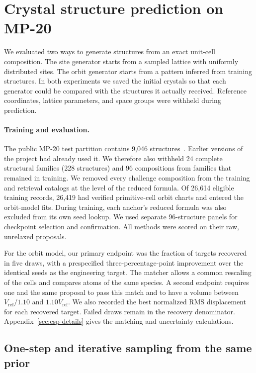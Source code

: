 \section{Crystal structure prediction on MP-20}\label{sec:csp-exp}

We evaluated two ways to generate structures from an exact unit-cell composition. The site generator starts from a sampled lattice with uniformly distributed sites. The orbit generator starts from a pattern inferred from training structures. In both experiments we saved the initial crystals so that each generator could be compared with the structures it actually received. Reference coordinates, lattice parameters, and space groups were withheld during prediction.

\paragraph{Training and evaluation.}
The public MP-20 test partition contains 9,046 structures~\cite{materialsproject,cdvae}. Earlier versions of the project had already used it. We therefore also withheld 24 complete structural families (228 structures) and 96 compositions from families that remained in training. We removed every challenge composition from the training and retrieval catalogs at the level of the reduced formula. Of 26,614 eligible training records, 26,419 had verified primitive-cell orbit charts and entered the orbit-model fits. During training, each anchor's reduced formula was also excluded from its own seed lookup. We used separate 96-structure panels for checkpoint selection and confirmation. All methods were scored on their raw, unrelaxed proposals.

For the orbit model, our primary endpoint was the fraction of targets recovered in five draws, with a prespecified three-percentage-point improvement over the identical seeds as the engineering target. The matcher allows a common rescaling of the cells and compares atoms of the same species. A second endpoint requires one and the same proposal to pass this match and to have a volume between $V_\mathrm{ref}/1.10$ and $1.10V_\mathrm{ref}$. We also recorded the best normalized RMS displacement for each recovered target. Failed draws remain in the recovery denominator. Appendix~\ref{sec:csp-details} gives the matching and uncertainty calculations.

\subsection{One-step and iterative sampling from the same prior}

